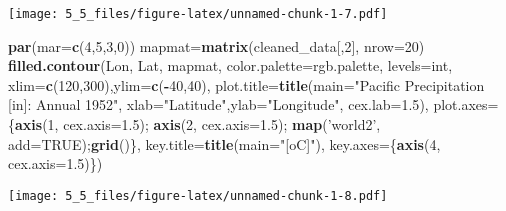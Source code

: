 \documentclass[]{article}
\newenvironment{Shaded}{\begin{snugshade}}{\end{snugshade}}
\newcommand{\KeywordTok}[1]{\textcolor[rgb]{0.13,0.29,0.53}{\textbf{#1}}}
\newcommand{\DataTypeTok}[1]{\textcolor[rgb]{0.13,0.29,0.53}{#1}}
\newcommand{\DecValTok}[1]{\textcolor[rgb]{0.00,0.00,0.81}{#1}}
\newcommand{\FloatTok}[1]{\textcolor[rgb]{0.00,0.00,0.81}{#1}}
\newcommand{\StringTok}[1]{\textcolor[rgb]{0.31,0.60,0.02}{#1}}
\newcommand{\OtherTok}[1]{\textcolor[rgb]{0.56,0.35,0.01}{#1}}
\newcommand{\OperatorTok}[1]{\textcolor[rgb]{0.81,0.36,0.00}{\textbf{#1}}}
\newcommand{\NormalTok}[1]{#1}
\begin{document}
\texttt{[image: 5\_5\_files/figure-latex/unnamed-chunk-1-7.pdf]}

\begin{Shaded}
\begin{Highlighting}[]
\KeywordTok{par}\NormalTok{(}\DataTypeTok{mar=}\KeywordTok{c}\NormalTok{(}\DecValTok{4}\NormalTok{,}\DecValTok{5}\NormalTok{,}\DecValTok{3}\NormalTok{,}\DecValTok{0}\NormalTok{))}
\NormalTok{mapmat=}\KeywordTok{matrix}\NormalTok{(cleaned_data[,}\DecValTok{2}\NormalTok{], }\DataTypeTok{nrow=}\DecValTok{20}\NormalTok{)}
\KeywordTok{filled.contour}\NormalTok{(Lon, Lat, mapmat, }\DataTypeTok{color.palette=}\NormalTok{rgb.palette, }\DataTypeTok{levels=}\NormalTok{int,}
               \DataTypeTok{xlim=}\KeywordTok{c}\NormalTok{(}\DecValTok{120}\NormalTok{,}\DecValTok{300}\NormalTok{),}\DataTypeTok{ylim=}\KeywordTok{c}\NormalTok{(}\OperatorTok{-}\DecValTok{40}\NormalTok{,}\DecValTok{40}\NormalTok{),}
               \DataTypeTok{plot.title=}\KeywordTok{title}\NormalTok{(}\DataTypeTok{main=}\StringTok{"Pacific Precipitation [in]: Annual 1952"}\NormalTok{,}
                                \DataTypeTok{xlab=}\StringTok{"Latitude"}\NormalTok{,}\DataTypeTok{ylab=}\StringTok{"Longitude"}\NormalTok{, }\DataTypeTok{cex.lab=}\FloatTok{1.5}\NormalTok{),}
               \DataTypeTok{plot.axes=}\NormalTok{\{}\KeywordTok{axis}\NormalTok{(}\DecValTok{1}\NormalTok{, }\DataTypeTok{cex.axis=}\FloatTok{1.5}\NormalTok{); }\KeywordTok{axis}\NormalTok{(}\DecValTok{2}\NormalTok{, }\DataTypeTok{cex.axis=}\FloatTok{1.5}\NormalTok{);}
                 \KeywordTok{map}\NormalTok{(}\StringTok{'world2'}\NormalTok{, }\DataTypeTok{add=}\OtherTok{TRUE}\NormalTok{);}\KeywordTok{grid}\NormalTok{()\},}
               \DataTypeTok{key.title=}\KeywordTok{title}\NormalTok{(}\DataTypeTok{main=}\StringTok{"[oC]"}\NormalTok{),}
               \DataTypeTok{key.axes=}\NormalTok{\{}\KeywordTok{axis}\NormalTok{(}\DecValTok{4}\NormalTok{, }\DataTypeTok{cex.axis=}\FloatTok{1.5}\NormalTok{)\})}
\end{Highlighting}
\end{Shaded}

\texttt{[image: 5\_5\_files/figure-latex/unnamed-chunk-1-8.pdf]}
\end{document}
